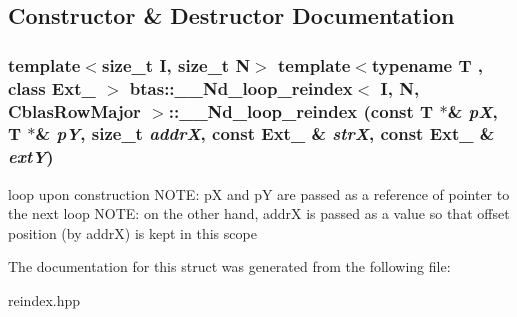 \subsection{Constructor \& Destructor Documentation}
\hypertarget{structbtas_1_1_____nd__loop__reindex_3_01_i_00_01_n_00_01_cblas_row_major_01_4_a922a5181568a6345d828f51f2d289d5d}{
\subsubsection[{\_\-\_\-Nd\_\-loop\_\-reindex}]{\setlength{\rightskip}{0pt plus 5cm}template$<$size\_\-t I, size\_\-t N$>$ template$<$typename T , class Ext\_\- $>$ btas::\_\-\_\-Nd\_\-loop\_\-reindex$<$ I, N, CblasRowMajor $>$::\_\-\_\-Nd\_\-loop\_\-reindex (const T $\ast$\& {\em pX}, \/  T $\ast$\& {\em pY}, \/  size\_\-t {\em addrX}, \/  const Ext\_\- \& {\em strX}, \/  const Ext\_\- \& {\em extY})}}
\label{structbtas_1_1_____nd__loop__reindex_3_01_i_00_01_n_00_01_cblas_row_major_01_4_a922a5181568a6345d828f51f2d289d5d}
loop upon construction NOTE: pX and pY are passed as a reference of pointer to the next loop NOTE: on the other hand, addrX is passed as a value so that offset position (by addrX) is kept in this scope 

The documentation for this struct was generated from the following file:\begin{DoxyCompactItemize}
\item 
reindex.hpp\end{DoxyCompactItemize}
